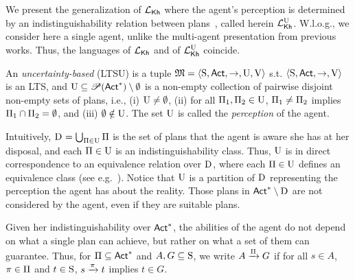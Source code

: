 We present the generalization of $\Khlogic$ where the agent's perception is determined by an indistinguishability relation between plans~\cite{AFSVQ21,AFSVQ25}, called herein $\Khunc$. W.l.o.g., we consider here a single agent, unlike the multi-agent presentation from previous works. Thus, the languages of $\Khlogic$ and of $\Khunc$ coincide. 

An \emph{uncertainty-based \lts} (LTSU) is a tuple $\model=\tup{\S,\Act,\ra,\Unc,\V}$ s.t. $\tup{\S,\Act,\ra,\V}$ is an LTS, and 
$\Unc\subseteq \powerset(\Act^*)\setminus \emptyset$ is a non-empty collection of pairwise disjoint non-empty sets of plans, i.e., (i) $\Unc\neq\emptyset$, (ii) for all $\plans_1,\plans_2\in\Unc$, $\plans_1\neq\plans_2$ implies  $\plans_1\cap\plans_2=\emptyset$, and (iii) $\emptyset\notin\Unc$. The set $\Unc$ is called the \emph{perception} of the agent. 


Intuitively, $\DS{} = \bigcup_{\plans \in \Unc} \plans$ is the set of plans that the  agent is aware she has at her disposal, and each $\plans \in \Unc$ is an indistinguishability class. Thus, $\Unc$ is in direct correspondence to an equivalence relation over $\DS{}$, where each $\plans\in\Unc$ defines an equivalence class (see e.g.~\cite{AFSVQ25}). 
%
Notice that $\Unc$ is a partition of $\DS{}$ representing the perception the agent has about the reality.  Those plans in $\Act^*\setminus\DS{}$ are not considered by the agent, even if they are suitable plans. 

Given her indistinguishability over $\Act^*$, the abilities of the agent do not  depend  on what a single plan can achieve, but rather on what a set of them can guarantee. Thus, for $\plans \subseteq \Act^*$ and $A,G \subseteq \S$, we write $A\reach{\plans} G$ if for all $s\in A$, $\plan\in\plans$ and $t\in \S$,  $s \reach{\plan} t$ implies $t\in G$. 

